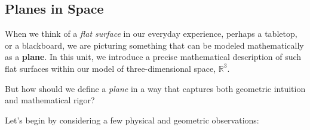 \subsection{Planes in Space}

When we think of a \emph{flat surface} in our everyday experience, perhaps a tabletop, or a blackboard, we are picturing something that can be modeled mathematically as a \textbf{plane}. In this unit, we introduce a precise mathematical description of such flat surfaces within our model of three-dimensional space, $\mathbb{R}^3$.

But how should we define a \emph{plane} in a way that captures both geometric intuition and mathematical rigor?

Let’s begin by considering a few physical and geometric observations:

